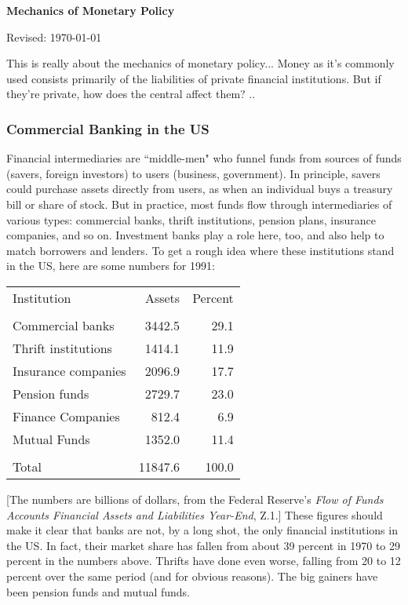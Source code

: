 \documentclass[letterpaper,12pt]{article}
\def\HeadName{Mechanics of Monetary Policy}
\begin{document}
\thispagestyle{empty}%
\Head

\centerline{\large \bf \HeadName}%
\centerline{Revised: \today}

\bigskip
This is really about the mechanics of monetary policy...
Money as it's commonly used consists primarily of the liabilities of private financial institutions.
But if they're private, how does the central affect them?  ..


\subsubsection*{Commercial Banking in the US}

     Financial intermediaries are ``middle-men" who funnel funds from sources
of funds (savers, foreign investors) to users (business, government).  In principle, savers could
purchase assets directly from users, as when an individual buys a treasury bill or share of stock.
But in practice, most funds flow through intermediaries of various types:  commercial banks,
thrift institutions, pension plans, insurance companies, and so on.  Investment banks play a role
here, too, and also help to match borrowers and lenders. To get a rough idea where these
institutions stand in the US, here are some numbers for 1991:
%
\begin{center}
\begin{tabular}{lrr}
               Institution          &   Assets   & Percent    \\
                                                 &            \\
               Commercial banks     &   3442.5   &  29.1      \\
               Thrift institutions  &   1414.1   &  11.9      \\
               Insurance companies  &   2096.9   &  17.7      \\
               Pension funds        &   2729.7   &  23.0      \\
               Finance Companies    &    812.4   &   6.9      \\
               Mutual Funds         &   1352.0   &  11.4      \\
                                                 &            \\
               Total                &  11847.6   & 100.0      \\
\end{tabular}
\end{center}
%
[The numbers are billions of dollars, from the Federal Reserve's {\em Flow of Funds Accounts
Financial Assets and Liabilities Year-End}, Z.1.]  These figures should make it clear that banks
are not, by a long shot, the only financial institutions in the US.  In fact, their market share
has fallen from about 39 percent in 1970 to 29 percent in the numbers above.  Thrifts have done
even worse, falling from 20 to 12 percent over the same period (and for obvious reasons). The big
gainers have been pension funds and mutual funds.
\end{document}
